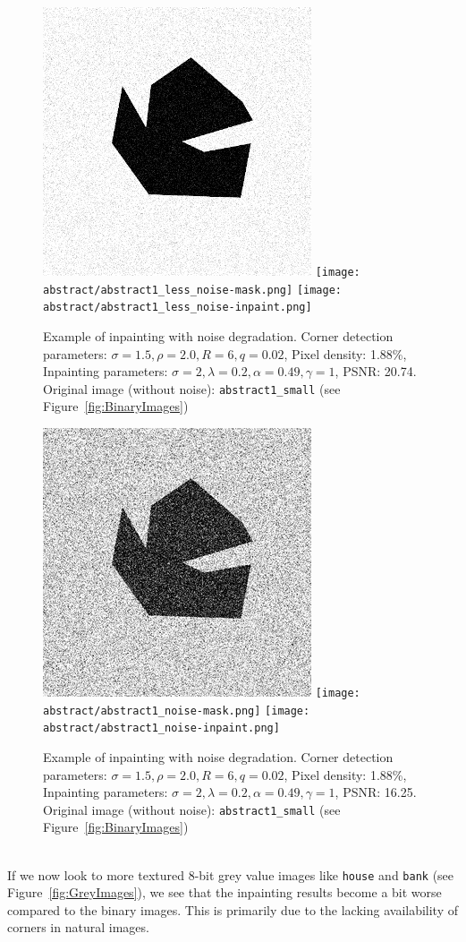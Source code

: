 \begin{figure}[ht]
    \centering
    \includegraphics[width=0.29\linewidth]{../../images/binary/abstract1_less_noise.png}
    \texttt{[image: abstract/abstract1\_less\_noise-mask.png]}
    \texttt{[image: abstract/abstract1\_less\_noise-inpaint.png]}
    \caption{Example of inpainting with noise degradation. Corner detection parameters:
    $\sigma=1.5,\rho=2.0,R=6,q=0.02$, Pixel density: 1.88\%, Inpainting parameters:
    $\sigma=2,\lambda=0.2,\alpha=0.49,\gamma=1$, PSNR\@: 20.74. Original image (without noise):
        \texttt{abstract1\_small} (see Figure~\ref{fig:BinaryImages})}\label{fig:AbstractNoise1}
\end{figure}
\begin{figure}[ht]
    \centering
    \includegraphics[width=0.29\linewidth]{../../images/binary/abstract1_noise.png}
    \texttt{[image: abstract/abstract1\_noise-mask.png]}
    \texttt{[image: abstract/abstract1\_noise-inpaint.png]}
    \caption{Example of inpainting with noise degradation. Corner detection parameters:
    $\sigma=1.5,\rho=2.0,R=6,q=0.02$, Pixel density: 1.88\%, Inpainting parameters:
$\sigma=2,\lambda=0.2,\alpha=0.49,\gamma=1$, PSNR\@: 16.25. Original image (without noise):
        \texttt{abstract1\_small} (see Figure~\ref{fig:BinaryImages})}\label{fig:AbstractNoise2}
\end{figure}                                       
\\ \noindent If we now look to more textured 8-bit grey value images like \texttt{house} and
\texttt{bank} (see Figure~\ref{fig:GreyImages}), we
see that the inpainting results become a bit worse compared to the binary images. This is primarily
due to the lacking availability of corners in natural images.\\\ \\
